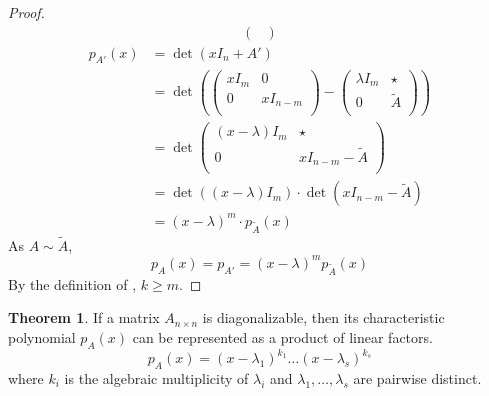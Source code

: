 \documentclass[fleqn, a4paper, 12pt, draft]{article}
\theoremstyle{definition}
\theoremstyle{theorem}
\newtheorem{theorem}{Theorem} %
\theoremstyle{remark}
\numberwithin{corollary}{theorem}
\numberwithin{equation}{theorem}
\begin{document}
\begin{proof}
\begin{align*}
\begin{pmatrix}
				\end{pmatrix}
	\end{align*}
	\begin{align*}
		p_{A'} (x) &= \det (x I_n + A')\\
		&= \det 
			\left( 
				\begin{pmatrix}
					x I_m & 0\\
					0 & x I_{n - m}\\
				\end{pmatrix}
				-
				\begin{pmatrix}
					\lambda I_m & \star\\
					0 & \tilde{A}\\
				\end{pmatrix}
			 \right)\\
		 &= \det
		 	\begin{pmatrix}
			 	(x - \lambda) I_m & \star\\
			 	0 & x I_{n - m} - \tilde{A}\\
		 	\end{pmatrix}\\
	 	&= \det ((x - \lambda) I_m) \cdot \det (x I_{n - m} - \tilde{A})\\
	 	&= (x - \lambda)^m \cdot p_{\tilde{A}} (x)
	\end{align*}
	As $A \sim \tilde{A}$,
	\begin{equation*}
		p_A (x) = p_{A'} = (x - \lambda)^m p_{\tilde{A}} (x)
	\end{equation*}
	By the definition of , $k \geq m$.
\end{proof}

\begin{theorem}
	If a matrix $A_{n \times n}$ is diagonalizable, then its characteristic polynomial $p_A (x)$ can be represented as a product of linear factors.
	\begin{equation*}
		p_A (x) = (x - \lambda_1)^{k_1} \dots (x - \lambda_s)^{k_s}
	\end{equation*}
	where $k_i$ is the algebraic multiplicity of $\lambda_i$ and $\lambda_1, \dots, \lambda_s$ are pairwise distinct.
\end{theorem}
\end{document}
